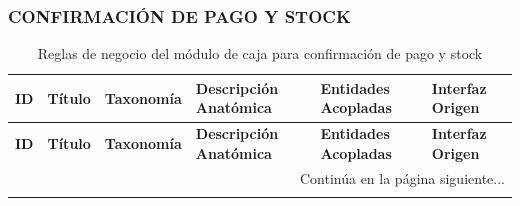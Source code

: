\begin{landscape}
\subsubsection{CONFIRMACIÓN DE PAGO Y STOCK}
\begingroup
\setlength{\LTleft}{\fill}
\setlength{\LTright}{\fill}

\begin{longtable}[c]{l p{2.1cm} p{2.1cm} p{8cm} p{4cm} p{3cm}}
\caption{Reglas de negocio del módulo de caja para confirmación de pago y stock} \label{tab:reglas-negocio-caja-confirmacion-pago-stock}\\
\toprule
\textbf{ID} & \textbf{Título} & \textbf{Taxonomía} & \textbf{Descripción Anatómica} & \textbf{Entidades Acopladas} & \textbf{Interfaz Origen} \\
\midrule
\endfirsthead

\toprule
\textbf{ID} & \textbf{Título} & \textbf{Taxonomía} & \textbf{Descripción Anatómica} & \textbf{Entidades Acopladas} & \textbf{Interfaz Origen} \\
\midrule
\endhead

\midrule
\multicolumn{6}{r}{\small Continúa en la página siguiente...} \\
\endfoot
\bottomrule
\endlastfoot


\end{longtable}
\end{landscape}
